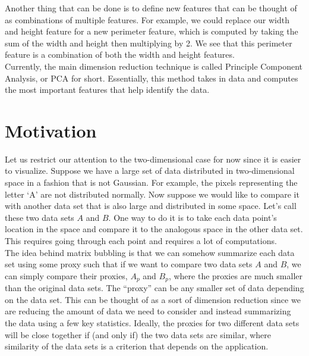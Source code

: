 \documentclass{article}
\begin{document}
Another thing that can be done is to define new features that can be thought of
as combinations of multiple features. For example, we could replace our width
and height feature for a new perimeter feature, which is computed by taking the
sum of the width and height then multiplying by 2. We see that this perimeter
feature is a combination of both the width and height features.\\

Currently, the main dimension reduction technique is called Principle Component
Analysis, or PCA for short. Essentially, this method takes in data and computes
the most important features that help identify the data.

\section{Motivation}

Let us restrict our attention to the two-dimensional case for now since it is
easier to visualize. Suppose we have a large set of data distributed in
two-dimensional space in a fashion that is not Gaussian. For example, the
pixels representing the letter `A' are not distributed normally. Now suppose we
would like to compare it with another data set that is also large and
distributed in some space. Let's call these two data sets $A$ and $B$. One way
to do it is to take each data point's location in the space and compare it to
the analogous space in the other data set. This requires going through each
point and requires a lot of computations.\\

The idea behind matrix bubbling is that we can somehow summarize each data set
using some proxy such that if we want to compare two data sets $A$ and $B$, we
can simply compare their proxies, $A_p$ and $B_p$, where the proxies are much
smaller than the original data sets. The ``proxy'' can be any smaller set of
data depending on the data set. This can be thought of as a sort of dimension
reduction since we are reducing the amount of data we need to consider and
instead summarizing the data using a few key statistics. Ideally, the proxies
for two different data sets will be close together if (and only if) the two
data sets are similar, where similarity of the data sets is a criterion that
depends on the application.\\
\end{document}
